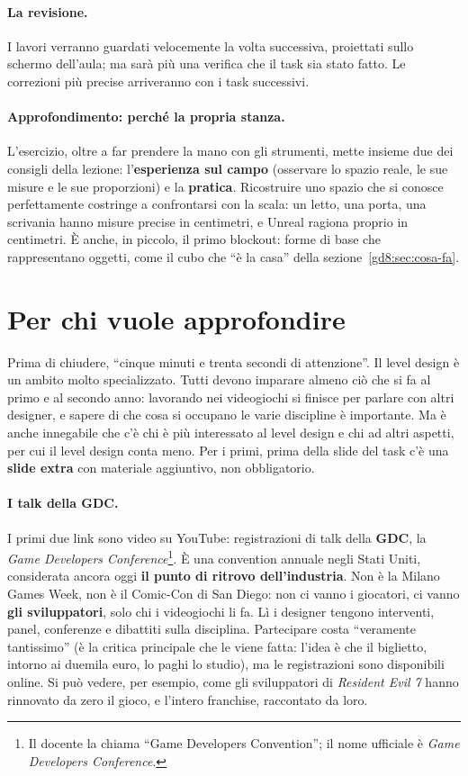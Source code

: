 \paragraph{La revisione.} I lavori verranno guardati velocemente la volta
successiva, proiettati sullo schermo dell'aula; ma sarà più una verifica che
il task sia stato fatto. Le correzioni più precise arriveranno con i task
successivi.

\paragraph{Approfondimento: perché la propria stanza.} L'esercizio, oltre a
far prendere la mano con gli strumenti, mette insieme due dei consigli della
lezione: l'\textbf{esperienza sul campo} (osservare lo spazio reale, le sue
misure e le sue proporzioni) e la \textbf{pratica}. Ricostruire uno spazio che
si conosce perfettamente costringe a confrontarsi con la scala: un letto, una
porta, una scrivania hanno misure precise in centimetri, e Unreal ragiona
proprio in centimetri. È anche, in piccolo, il primo blockout: forme di base
che rappresentano oggetti, come il cubo che ``è la casa'' della
sezione~\ref{gd8:sec:cosa-fa}.

\section{Per chi vuole approfondire}
\label{gd8:sec:extra}

Prima di chiudere, ``cinque minuti e trenta secondi di attenzione''. Il level
design è un ambito molto specializzato. Tutti devono imparare almeno ciò che
si fa al primo e al secondo anno: lavorando nei videogiochi si finisce per
parlare con altri designer, e sapere di che cosa si occupano le varie
discipline è importante. Ma è anche innegabile che c'è chi è più interessato
al level design e chi ad altri aspetti, per cui il level design conta meno.
Per i primi, prima della slide del task c'è una \textbf{slide extra} con
materiale aggiuntivo, non obbligatorio.

\paragraph{I talk della GDC.} I primi due link sono video su YouTube:
registrazioni di talk della \textbf{GDC}, la \emph{Game Developers
Conference}\footnote{Il docente la chiama ``Game Developers Convention''; il
nome ufficiale è \emph{Game Developers Conference}.}. È una convention annuale
negli Stati Uniti, considerata ancora oggi \textbf{il punto di ritrovo
dell'industria}. Non è la Milano Games Week, non è il Comic-Con di San Diego:
non ci vanno i giocatori, ci vanno \textbf{gli sviluppatori}, solo chi i
videogiochi li fa. Lì i designer tengono interventi, panel, conferenze e
dibattiti sulla disciplina. Partecipare costa ``veramente tantissimo'' (è la
critica principale che le viene fatta: l'idea è che il biglietto, intorno ai
duemila euro, lo paghi lo studio), ma le registrazioni sono disponibili online.
Si può vedere, per esempio, come gli sviluppatori di \emph{Resident Evil 7}
hanno rinnovato da zero il gioco, e l'intero franchise, raccontato da loro.

